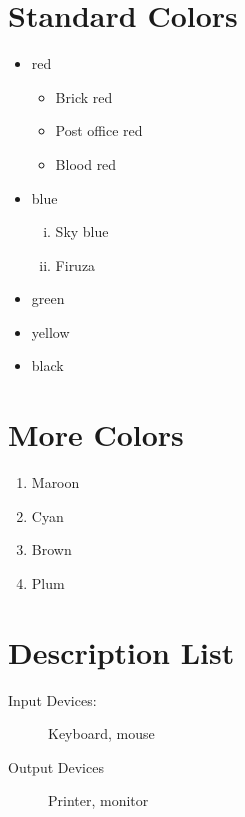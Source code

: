 \documentclass{article}
\begin{document}
	\renewcommand{\labelitemi}{$\diamond$}
	\renewcommand{\labelitemii}{$\blacksquare$}
	\section{Standard Colors}
	\begin{itemize}
		\item red
		\begin{itemize}
			\item Brick red
			\item Post office red
			\item Blood red
		\end{itemize}
		\item blue
		\begin{enumerate}[i.]
			\item Sky blue
			\item Firuza
		\end{enumerate}
		\item green
		\item yellow
		\item black
	\end{itemize}
	
	\section{More Colors}
	\begin{enumerate}
		\item Maroon
		\item Cyan
		\item Brown
		\item Plum
	\end{enumerate}
	
	\section{Description List}
	\begin{description}
		\item[Input Devices:] Keyboard, mouse
		\item[Output Devices] Printer, monitor
	\end{description}
	
\end{document}
